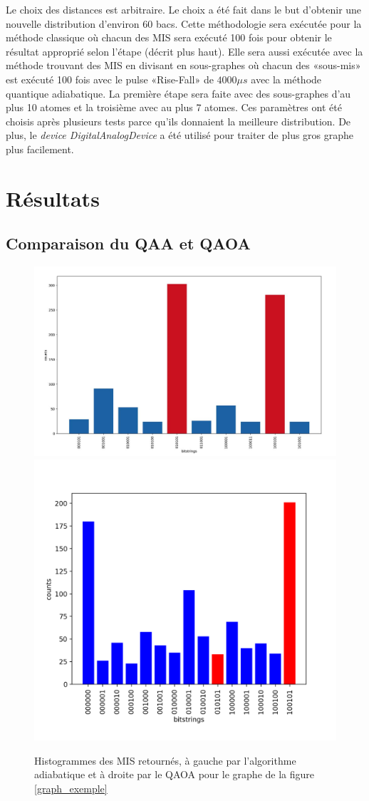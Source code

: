 \documentclass[11pt]{article}
\begin{document}
Le choix des distances est arbitraire. Le choix a été fait dans le but d'obtenir une nouvelle distribution d'environ 60 bacs.
Cette méthodologie sera exécutée pour la méthode classique où chacun des MIS sera exécuté 100 fois pour obtenir le résultat approprié selon l'étape (décrit plus haut).
Elle sera aussi exécutée avec la méthode trouvant des MIS en divisant en sous-graphes où chacun des «sous-mis» est exécuté 100 fois avec le pulse  «Rise-Fall» de $4000 \mu s$ avec la méthode quantique adiabatique. La première étape sera faite avec des sous-graphes d'au plus 10 atomes et la troisième avec au plus 7 atomes. Ces paramètres ont été choisis après plusieurs tests parce qu'ils donnaient la meilleure distribution. De plus, le \textit{device DigitalAnalogDevice} a été utilisé pour traiter de plus gros graphe plus facilement.



\section{Résultats}
\subsection{Comparaison du QAA et QAOA}
\begin{figure}[H]
    \centering
    \includegraphics[width = 0.50\linewidth]{images/qaa_res.jpeg}
    \includegraphics[width=0.45\linewidth]{images/qaoa_res.png}
    \caption{Histogrammes  des MIS retournés, à gauche par l'algorithme adiabatique et à droite par le QAOA pour le  graphe de la figure \ref{graph_exemple}}
    \label{qaoavsqaa}
\end{figure}
\end{document}
